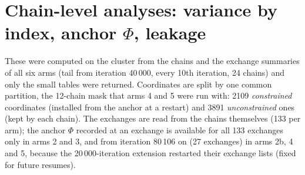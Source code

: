\documentclass[11pt]{article}
\begin{document}
\section{Chain-level analyses: variance by index, anchor $\Phi$, leakage}\label{sec:chain}
These were computed on the cluster from the chains and the exchange summaries of all six arms (tail from iteration 40\,000, every 10th iteration, 24 chains) and only the small tables were returned. Coordinates are split by one common partition, the 12-chain mask that arms 4 and 5 were run with: 2109 \emph{constrained} coordinates (installed from the anchor at a restart) and 3891 \emph{unconstrained} ones (kept by each chain). The exchanges are read from the chains themselves (133 per arm); the anchor $\Phi$ recorded at an exchange is available for all 133 exchanges only in arms 2 and 3, and from iteration 80\,106 on (27 exchanges) in arms 2b, 4 and 5, because the 20\,000-iteration extension restarted their exchange lists (fixed for future resumes).
\end{document}
